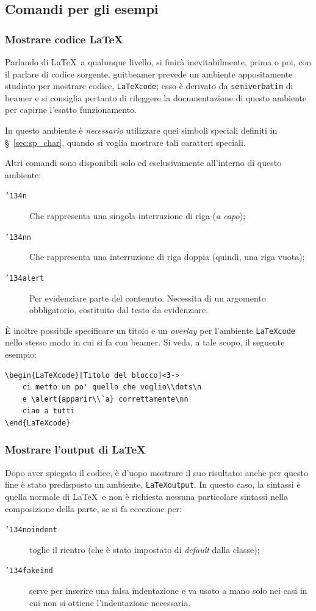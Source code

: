 \documentclass[a4paper,10pt]{article}
\newcommand{\lcap}{{\fontencoding{T1}\selectfont\guillemotleft}}
\newcommand{\rcap}{{\fontencoding{T1}\selectfont\guillemotright}}
\newcommand{\Cap}[1]{\lcap #1\rcap}
\newcommand{\bs}{{\char'134}}%
\newcommand{\pkg}[1]{\textsf{#1}}
\let\cls\pkg
\newcommand{\env}[1]{\texttt{#1}}
\newcommand{\cmd}[1]{\texttt{\bs #1}}
\begin{document}
\subsection{Comandi per gli esempi}
\subsubsection{Mostrare codice \LaTeX}
Parlando di \LaTeX\ a qualunque livello, si finirà inevitabilmente,
prima o poi, con il parlare di codice sorgente. \cls{guitbeamer}
prevede un ambiente appositamente studiato per mostrare codice,
\env{LaTeXcode}; esso è derivato da \env{semiverbatim} di \cls{beamer}
e si consiglia pertanto di rileggere la documentazione di questo
ambiente \cite{manbeamer} per capirne l'esatto funzionamento.

In questo ambiente è \emph{necessario} utilizzare quei simboli
speciali definiti in \S~\ref{sec:sp_char}, quando si voglia
\Cap{mostrare} tali caratteri speciali.

Altri comandi sono disponibili solo ed esclusivamente all'interno di
questo ambiente:
\begin{description}
	\item[\cmd{n}]Che rappresenta una singola interruzione di
	  riga (\emph{a capo});
	\item[\cmd{nn}]Che rappresenta una interruzione di riga
		doppia (quindi, una riga vuota);
	\item[\cmd{alert}]Per evidenziare parte del contenuto.
	  Necessita di un argomento obbligatorio, costituito dal testo
	  da evidenziare.
\end{description}

\`E inoltre possibile specificare un titolo e un \textit{overlay} per
l'ambiente \env{LaTeXcode} nello stesso modo in cui si fa con
\cls{beamer}. Si veda, a tale scopo, il seguente esempio:
\begin{Verbatim}[gobble=0]
\begin{LaTeXcode}[Titolo del blocco]<3->
	ci metto un po' quello che voglio\\dots\n
	e \alert{apparir\\`a} correttamente\nn
	ciao a tutti
\end{LaTeXcode}
\end{Verbatim}
 
\subsubsection{Mostrare l'output di \LaTeX}
Dopo aver spiegato il codice, è d'uopo mostrare il suo risultato:
 anche per questo fine è stato predisposto un ambiente,
\env{LaTeXoutput}. In questo caso, la sintassi è quella normale di
\LaTeX\ e non è richiesta nessuna particolare sintassi nella
composizione della parte, se si fa eccezione per:
\begin{description}
  \item[\cmd{noindent}]toglie il rientro (che è stato impostato di
    \textit{default} dalla classe);
  \item[\cmd{fakeind}]serve per inserire una falsa indentazione e va
    usato a mano solo nei casi in cui non si ottiene l'indentazione
    necessaria.
\end{description}
\end{document}
